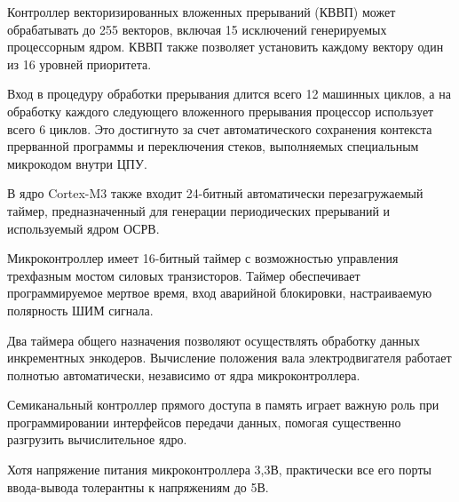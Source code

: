         Контроллер векторизированных вложенных прерываний (КВВП) может
        обрабатывать до 255 векторов, включая 15 исключений генерируемых
        процессорным ядром. КВВП также позволяет установить каждому вектору
        один из 16 уровней приоритета.

        Вход в процедуру обработки прерывания длится всего 12 машинных
        циклов, а на обработку каждого следующего вложенного прерывания
        процессор использует всего 6 циклов. Это достигнуто  за счет
        автоматического сохранения контекста прерванной программы и
        переключения стеков, выполняемых специальным микрокодом внутри ЦПУ.

        В ядро Cortex-M3 также входит 24-битный автоматически перезагружаемый
        таймер, предназначенный для генерации периодических прерываний и
        используемый ядром ОСРВ.

        Микроконтроллер имеет 16-битный таймер с возможностью управления
        трехфазным мостом силовых транзисторов. Таймер обеспечивает
        программируемое мертвое время, вход аварийной блокировки,
        настраиваемую полярность ШИМ сигнала.

        Два таймера общего назначения позволяют осуществлять обработку данных
        инкрементных энкодеров. Вычисление положения вала электродвигателя
        работает полнотью автоматически, независимо от ядра микроконтроллера.

        Семиканальный контроллер прямого доступа в память играет важную роль при
        программировании интерфейсов передачи данных, помогая существенно разгрузить
        вычислительное ядро.

        Хотя напряжение питания микроконтроллера 3,3В, практически все его
        порты ввода-вывода толерантны к напряжениям до 5В.

